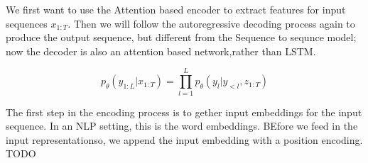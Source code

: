 \documentclass[11pt]{article}
\begin{document}
\begin{figure}[H]
    \centering
\end{figure}

We first want to use the Attention based encoder to extract features for input sequences $x_{1:T}$. Then we will follow the autoregressive decoding process again to produce the output sequence, but different from the Sequence to sequnce model; now the decoder is also an attention based network,rather than LSTM. 

\begin{equation}
    p_\theta(y_{1:L}|x_{1:T}) = \prod^L_{l=1}p_\theta(y_l|y_{<l},z_{1:T})
\end{equation}

The first step in the encoding process is to gether input embeddings for the input sequence. In an NLP setting, this is the word embeddings. BEfore we feed in the input representationso, we append the input embedding with a position encoding. {\color{red}TODO}
\end{document}
